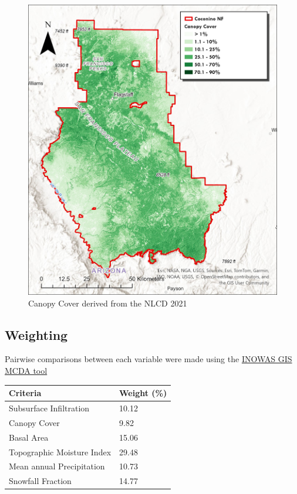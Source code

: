 \documentclass[
  number]{elsarticle}
\begin{document}
\begin{figure}[H]

{\centering \includegraphics{images/Canopy_Cover.jpg}

}

\caption{Canopy Cover derived from the NLCD 2021}

\end{figure}%

\subsection{Weighting}\label{weighting}

Pairwise comparisons between each variable were made using the
\href{https://www.inowas.com/tools/t05-gis-mcda/}{INOWAS GIS MCDA tool}

\begin{longtable}[]{@{}ll@{}}
\toprule\noalign{}
Criteria & Weight (\%) \\
\midrule\noalign{}
\endhead
\bottomrule\noalign{}
\endlastfoot
Subsurface Infiltration & 10.12 \\
Canopy Cover & 9.82 \\
Basal Area & 15.06 \\
Topographic Moisture Index & 29.48 \\
Mean annual Precipitation & 10.73 \\
Snowfall Fraction & 14.77 \\
\end{longtable}
\end{document}

